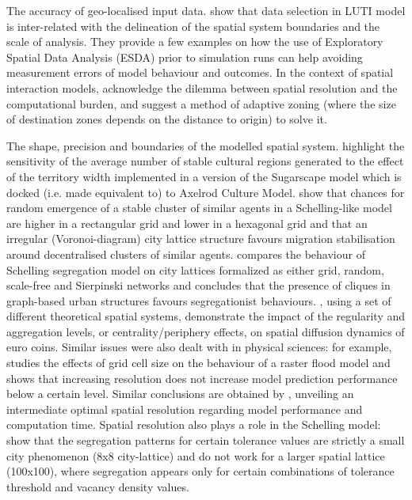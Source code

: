 \documentclass{JASSS}
\begin{document}
\begin{itemize*}
\item The accuracy of geo-localised input data. \citet{Thomasetal2017} show that data selection in LUTI model is inter-related with the delineation of the spatial system boundaries and the scale of analysis. They provide a few examples on how the use of Exploratory Spatial Data Analysis (ESDA) prior to simulation runs can help avoiding measurement errors of model behaviour and outcomes. In the context of spatial interaction models, \citet{hagen2012new} acknowledge the dilemma between spatial resolution and the computational burden, and suggest a method of adaptive zoning (where the size of destination zones depends on the distance to origin) to solve it.
\item The shape, precision and boundaries of the modelled spatial system. \citet{Axtelletal1996} highlight the sensitivity of the average number of stable cultural regions generated to the effect of the territory width implemented in a version of the Sugarscape model which is docked (i.e. made equivalent to) to Axelrod Culture Model. \citet{FlacheHegselmann2001} show that chances for random emergence of a stable cluster of similar agents in a Schelling-like model are higher in a rectangular grid and lower in a hexagonal grid and that an irregular (Voronoi-diagram) city lattice structure favours migration stabilisation around decentralised clusters of similar agents. \citet{Banos2012} compares the behaviour of Schelling segregation model on city lattices formalized as either grid, random, scale-free and Sierpinski networks and concludes that the presence of cliques in graph-based urban structures favours segregationist behaviours. \citet{LeTexierCaruso2017}, using a set of different theoretical spatial systems, demonstrate the impact of the regularity and aggregation levels, or centrality/periphery effects, on spatial diffusion dynamics of euro coins. Similar issues were also dealt with in physical sciences: for example, \cite{horritt2001effects} studies the effects of grid cell size on the behaviour of a raster flood model and shows that increasing resolution does not increase model prediction performance below a certain level. Similar conclusions are obtained by \cite{vazquez2002effect}, unveiling an intermediate optimal spatial resolution regarding model performance and computation time. Spatial resolution also plays a role in the Schelling model: \citet{Singhetal2009} show that the segregation patterns for certain tolerance values are strictly a small city phenomenon (8x8 city-lattice) and do not work for a larger spatial lattice (100x100), where segregation appears only for certain combinations of tolerance threshold and vacancy density values.

\end{itemize*}
\end{document}
